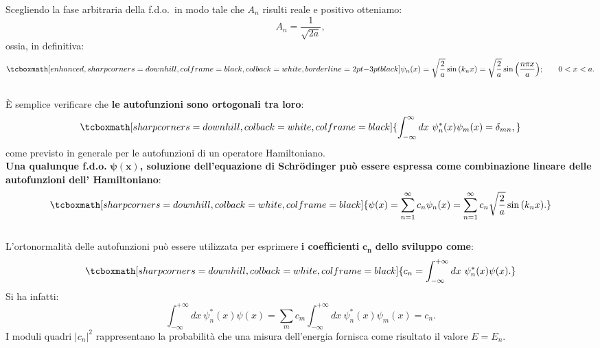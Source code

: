 Scegliendo la fase arbitraria della f.d.o.~in modo tale che $A_n$ risulti reale e positivo otteniamo:
	\begin{equation}
		A_n = \frac{1}{\sqrt{2a}},
	\end{equation}
ossia, in definitiva:
	\begin{equation}
		\tcboxmath[enhanced, sharp corners=downhill, colframe=black, colback=white, borderline={2pt}{-3pt}{black}]{
			\psi _n (x)= \sqrt{\frac{2}{a}} \sin{\left( k_n x\right)} = \sqrt{\frac{2}{a}} \sin{\left( \frac{n \pi x}{a}\right)};
			} \qquad 0<x<a.
\end{equation}\\

È semplice verificare che \textbf{le autofunzioni sono ortogonali tra loro}:
	\begin{equation}
		\tcboxmath[sharp corners=downhill, colback=white, colframe=black]{
			\int _{-\infty} ^{\infty} dx\ \psi_n ^* (x) \psi _m (x) = \delta _{mn},
			}
	\end{equation}
come previsto in generale per le autofunzioni di un operatore Hamiltoniano.\\ 

\textbf{Una qualunque f.d.o.} $\mathbf{\psi (x)}$\textbf{, soluzione dell'equazione di Schr\"{o}dinger può essere espressa come combinazione lineare delle autofunzioni dell' Hamiltoniano}:
	\begin{equation}
		\tcboxmath[sharp corners=downhill, colback=white, colframe=black]{
			\psi (x) = \sum _{n=1} ^{\infty} c_n \psi _n (x) = \sum _{n=1} ^{\infty} c_n \sqrt{\frac{2}{a}} \sin {\left( k_n x \right)}.
			}
	\end{equation}\\
	
L'ortonormalità delle autofunzioni può essere utilizzata per esprimere \textbf{i coefficienti} $\mathbf{c_n}$ \textbf{dello sviluppo come}:
	\begin{equation}
		\tcboxmath[sharp corners=downhill, colback=white, colframe=black]{
			c_n = \int _{-\infty} ^{+\infty} dx\ \psi _n ^* (x) \psi(x).
			}
	\end{equation}
Si ha infatti:
\begin{equation}
\int _{-\infty} ^{+\infty} dx\ \psi _n ^* (x) \psi(x)= \sum _m c_m \int _{-\infty} ^{+\infty} dx\ \psi _n ^* (x) \psi _m(x)= c_n.
\end{equation}
I moduli quadri $|c_n|^2$ rappresentano la probabilità che una misura dell'energia fornisca come risultato il valore $E=E_n$.\\

